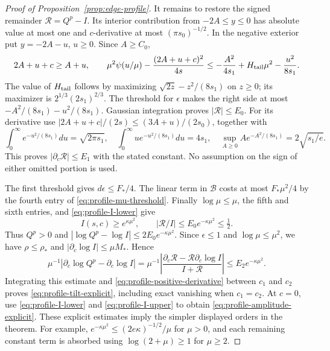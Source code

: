 \begin{proof}[Proof of Proposition~\ref{prop:edge-profile}]
It remains to restore the signed remainder $\mathcal R=Q^p-I$.
Its interior contribution from $-2A\le y\le0$ has absolute value at
most one and $c$-derivative at most $(\pi s_0)^{-1/2}$.  In the
negative exterior put $y=-2A-u$, $u\ge0$.  Since $A\ge C_0$,
\[
 2A+u+c\ge A+u,\qquad
 \mu^2\psi(u/\mu)-\frac{(2A+u+c)^2}{4s}
 \le-\frac{A^2}{4s_1}+H_{\rm tail}\mu^2
                            -\frac{u^2}{8s_1}.
\]
The value of $H_{\rm tail}$ follows by maximizing
$\sqrt{2z}-z^2/(8s_1)$ on $z\ge0$; its maximizer is
$2^{1/3}(2s_1)^{2/3}$.  The threshold for $\epsilon$ makes the
right side at most $-A^2/(8s_1)-u^2/(8s_1)$.
Gaussian integration proves $|\mathcal R|\le E_0$.
For its derivative use
$|2A+u+c|/(2s)\le(3A+u)/(2s_0)$, together with
\[
 \int_0^\infty e^{-u^2/(8s_1)}du=\sqrt{2\pi s_1},\quad
 \int_0^\infty u e^{-u^2/(8s_1)}du=4s_1,\quad
 \sup_{A\ge0}Ae^{-A^2/(8s_1)}=2\sqrt{s_1/e}.
\]
This proves $|\partial_c\mathcal R|\le E_1$ with the stated constant.
No assumption on the sign of either omitted portion is used.

The first threshold gives $d\epsilon\le F_*/4$.  The linear term
in $\mathcal B$ costs at most $F_*\mu^2/4$ by the fourth entry of
\eqref{eq:profile-mu-threshold}.  Finally $\log\mu\le\mu$,
the fifth and sixth entries, and \eqref{eq:profile-I-lower} give
\[
 I(s,c)\ge e^{\kappa\mu^2},\qquad
 |\mathcal R/I|\le E_0e^{-\kappa\mu^2}\le\tfrac12.
\]
Thus $Q^p>0$ and
$|\log Q^p-\log I|\le2E_0e^{-\kappa\mu^2}$.
Since $\epsilon\le1$ and $\log\mu\le\mu^2$, we have
$\rho\le\rho_*$ and $|\partial_c\log I|\le\mu M_*$.  Hence
\[
 \mu^{-1}|\partial_c\log Q^p-\partial_c\log I|
 =\mu^{-1}\left|
   \frac{\partial_c\mathcal R-\mathcal R\partial_c\log I}
        {I+\mathcal R}\right|
 \le E_2e^{-\kappa\mu^2}.
\]
Integrating this estimate and
\eqref{eq:profile-positive-derivative} between $c_1$ and $c_2$
proves \eqref{eq:profile-tilt-explicit}, including exact vanishing when
$c_1=c_2$.  At $c=0$, use \eqref{eq:profile-I-lower} and
\eqref{eq:profile-I-upper} to obtain
\eqref{eq:profile-amplitude-explicit}.  These explicit estimates imply
the simpler displayed orders in the theorem.  For example,
$e^{-\kappa\mu^2}\le(2e\kappa)^{-1/2}/\mu$ for $\mu>0$,
and each remaining constant term is absorbed using
$\log(2+\mu)\ge1$ for $\mu\ge2$.
\end{proof}

